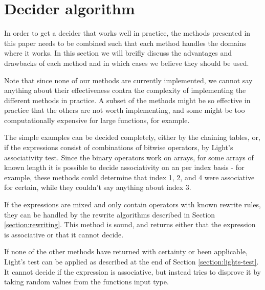 \section{Decider algorithm}
In order to get a decider that works well in practice, the methods presented in this paper
needs to be combined such that each method handles the domains where it works. In this
section we will breifly discuss the advantages and drawbacks of each method and in which
cases we believe they should be used.

Note that since none of our methods are currently implemented, we cannot say anything
about their effectiveness contra the complexity of implementing the different methods
in practice. A subset of the methods might be so effective in practice that the others
are not worth implementing, and some might be too computationally expensive for large
functions, for example.

The simple examples can be decided completely, either by the chaining tables, or, if the
expressions consist of combinations of bitwise operators, by Light's associativity test.
Since the binary operators work on arrays, for some arrays of known length it is possible
to decide associativity on an per index basis - for example, these methods could determine
that index 1, 2, and 4 were associative for certain, while they couldn't say anything
about index 3.

If the expressions are mixed and only contain operators with known rewrite rules, they can
be handled by the rewrite algorithms described in Section \ref{section:rewriting}. This
method is sound, and returns either that the expression is associative or that it cannot
decide.

If none of the other methods have returned with certainty or been applicable, Light's
test can be applied as described at the end of Section \ref{section:lights-test}. It
cannot decide if the expression is associative, but instead tries to disprove it by taking
random values from the functions input type.
